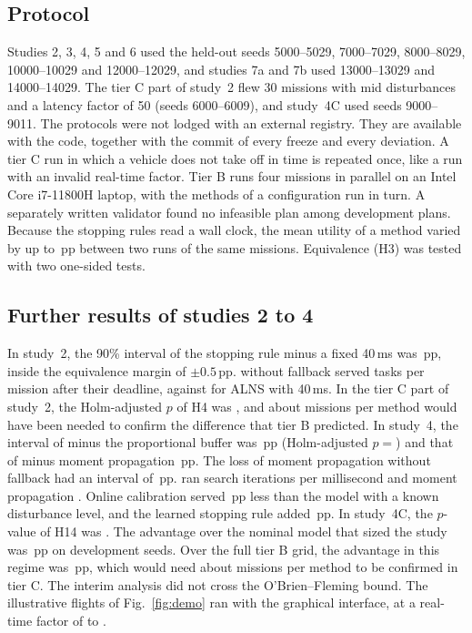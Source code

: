 \subsection{Protocol}
Studies 2, 3, 4, 5 and 6 used the held-out seeds 5000--5029, 7000--7029, 8000--8029, 10000--10029 and 12000--12029,
and studies 7a and 7b used 13000--13029 and 14000--14029. The tier C part of study~2 flew 30 missions with mid
disturbances and a latency factor of 50 (seeds 6000--6009), and study~4C used seeds 9000--9011. The protocols were not
lodged with an external registry. They are available with the code, together with the commit of every freeze and every
deviation. A tier C run in which a vehicle does not take off in time is repeated once, like a run with an invalid
real-time factor. Tier B runs four missions in parallel on an Intel Core i7-11800H laptop, with the methods of a
configuration run in turn. A separately written validator found no infeasible plan among 
development plans. Because the stopping rules read a wall clock, the mean utility of a method varied by up to
\,pp between two runs of the same missions. Equivalence (H3) was tested with two one-sided tests.

\subsection{Further results of studies 2 to 4}
In study~2, the 90\% interval of the stopping rule minus a fixed 40\,ms was \,pp, inside the
equivalence margin of $\pm0.5$\,pp. \mname{} without fallback served  tasks per mission after their
deadline, against  for ALNS with 40\,ms. In the tier C part of study~2, the Holm-adjusted $p$ of H4 was
, and about  missions per method would have been needed to confirm the difference that
tier B predicted. In study~4, the interval of \mname{} minus the proportional buffer was \,pp
(Holm-adjusted $p={}$) and that of \mname{} minus moment propagation \,pp. The loss of
moment propagation without fallback had an interval of \,pp. \mname{} ran  search iterations per millisecond and
moment propagation . Online calibration served \,pp less than the model with a known
disturbance level, and the learned stopping rule added \,pp. In study~4C, the $p$-value of H14 was
. The advantage over the nominal model that sized the study was \,pp on development seeds.
Over the full tier B grid, the advantage in this regime was \,pp, which would need about
 missions per method to be confirmed in tier C. The interim analysis did not cross the
O'Brien--Fleming bound. The illustrative flights of Fig.~\ref{fig:demo} ran with the graphical interface, at a
real-time factor of  to .

